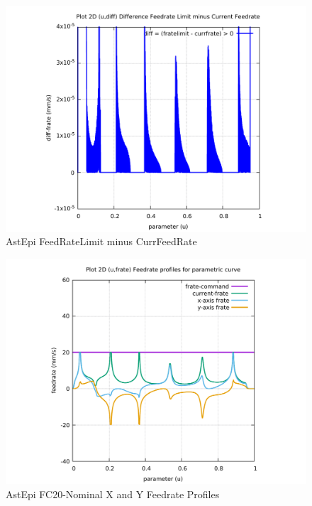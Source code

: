 \begin{figure}
	\caption     {AstEpi FeedRateLimit minus CurrFeedRate}
	\label{12-img-AstEpi-FeedRateLimit-minus-CurrFeedRate.pdf}
\includegraphics[width=1.00\textwidth]{Chap4/appendix/app-AstEpi/plots/12-img-AstEpi-FeedRateLimit-minus-CurrFeedRate.pdf}
\end{figure}

\clearpage
\pagebreak

\begin{figure}
	\caption     {AstEpi FC20-Nominal X and Y Feedrate Profiles}
	\label{13-img-AstEpi-FC20-Nominal-X-and-Y-Feedrate-Profiles.pdf}
\includegraphics[width=1.00\textwidth]{Chap4/appendix/app-AstEpi/plots/13-img-AstEpi-FC20-Nominal-X-and-Y-Feedrate-Profiles.pdf}
\end{figure}


